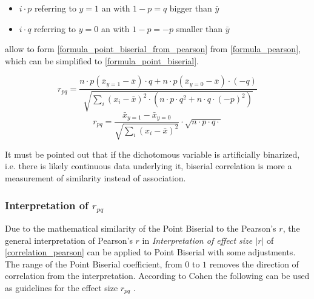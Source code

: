 \begin{itemize}
	\item $i \cdot p$ referring to $y=1$ an with $1 - p = q$ bigger than $\bar{y}$
	\item $i \cdot q$ referring to $y=0$ an with $1 - p = -p$ smaller than $\bar{y}$
\end{itemize}
allow to form \cref{formula_point_biserial_from_pearson} from \cref{formula_pearson}, which can be simplified to \cref{formula_point_biserial}. \parencite{Tate1954,CohenWest2003,Bortz2004,DeJesus2019}

\smallskip

\begin{equation}
\label{formula_point_biserial_from_pearson}
	r_{pq} =  \frac{n \cdot p (\bar{x}_{y=1}-\bar{x}) \cdot q + n \cdot p (\bar{x}_{y=0}-\bar{x}) \cdot (-q)}{\sqrt{\sum_{i}{(x_i-\bar{x})^2} \cdot (n \cdot p \cdot q^2 + n \cdot q \cdot (-p)^2)}}
\end{equation}
\begin{equation}
\label{formula_point_biserial}
	r_{pq} =  \frac{\bar{x}_{y=1}-\bar{x}_{y=0}}{\sqrt{\sum_{i}{(x_i-\bar{x})^2}}} \cdot \sqrt{n \cdot p \cdot q \cdot} 
\end{equation}

\smallskip

It must be pointed out that if the dichotomous variable is artificially binarized, i.e. there is likely continuous data underlying it, biserial correlation is more a measurement of similarity instead of association.

\subsubsection{Interpretation of $r_{pq}$}
Due to the mathematical similarity of the Point Biserial to the Pearson's $r$, the general interpretation of Pearson's $r$ in \textit{Interpretation of effect size $|r|$} of \cref{correlation_pearson} can be applied to Point Biserial with some adjustments. The range of the Point Biserial coefficient, from $0$ to $1$ removes the direction of correlation from the interpretation. According to Cohen \parencite{Cohen1988} the following can be used as guidelines for the effect size $r_{pq}$ \parencite{Leblanc2017}.

